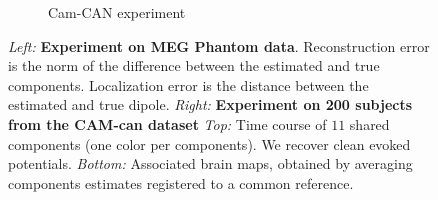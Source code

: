 \documentclass{report}
\begin{document}
{\begin{figure}
\begin{minipage}{\linewidth}
\begin{minipage}{0.45\linewidth}
\begin{subfigure}[t]{\textwidth}
            \caption{Cam-CAN experiment}
        \end{subfigure}
      \end{minipage}
    \end{minipage}
    \setlength{\belowcaptionskip}{-10pt}
    \caption{\emph{Left:} \textbf{Experiment on MEG Phantom data}. Reconstruction error is the norm of the difference between the estimated and true components. Localization error is the distance between the estimated and true dipole. \emph{Right:} \textbf{Experiment on 200 subjects from the CAM-can dataset} \emph{Top:} Time course of $11$ shared components (one color per components). We recover clean evoked potentials. \emph{Bottom:} Associated brain maps, obtained by averaging components estimates registered to a common reference.}
    \label{fig:meg}
\end{figure}

\vspace{-11pt}
%
%

}
\end{document}
